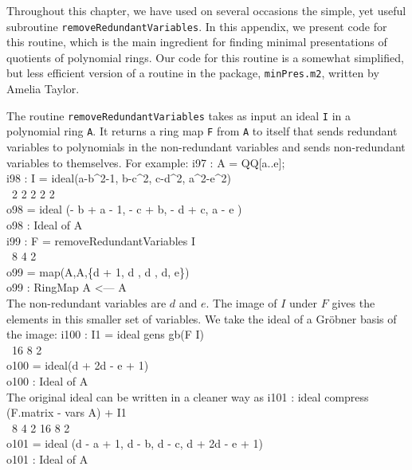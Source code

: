 Throughout this chapter, we have used on several occasions the simple, yet
useful subroutine {\tt removeRedundantVariables}.
In this appendix, we present \Mtwo code for this routine,
which is the main ingredient for finding minimal
presentations of quotients of polynomial rings.
Our code for this routine is a somewhat simplified, but less
efficient version of a routine in the \Mtwo package, {\tt minPres.m2},
written by Amelia Taylor.

The routine {\tt removeRedundantVariables} takes as input an ideal {\tt I} in
a polynomial ring {\tt A}.  It returns a ring map {\tt F} from {\tt A} to
itself that sends redundant variables to polynomials in the non-redundant
variables and sends non-redundant variables to themselves.  For example:
  \beginOutput
i97 : A = QQ[a..e];\\
\endOutput
  \beginOutput
i98 : I = ideal(a-b^2-1, b-c^2, c-d^2, a^2-e^2)\\
\emptyLine
\                2             2         2       2    2\\
o98 = ideal (- b  + a - 1, - c  + b, - d  + c, a  - e )\\
\emptyLine
o98 : Ideal of A\\
\endOutput
  \beginOutput
i99 : F = removeRedundantVariables I\\
\emptyLine
\                8       4   2\\
o99 = map(A,A,\{d  + 1, d , d , d, e\})\\
\emptyLine
o99 : RingMap A <--- A\\
\endOutput
The non-redundant variables are $d$ and $e$.  The image of $I$ under $F$
gives the elements in this smaller set of variables.  We take the ideal of a 
Gr\"obner basis of the image:
  \beginOutput
i100 : I1 = ideal gens gb(F I)\\
\emptyLine
\              16     8    2\\
o100 = ideal(d   + 2d  - e  + 1)\\
\emptyLine
o100 : Ideal of A\\
\endOutput
The original ideal can be written in a cleaner way as
  \beginOutput
i101 : ideal compress (F.matrix - vars A) + I1\\
\emptyLine
\               8           4       2       16     8    2\\
o101 = ideal (d  - a + 1, d  - b, d  - c, d   + 2d  - e  + 1)\\
\emptyLine
o101 : Ideal of A\\
\endOutput
  
